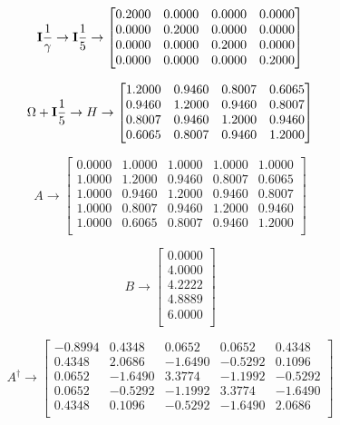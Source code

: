 \begin{equation}
  \vb{I}\frac{1}{\gamma}\to\vb{I}\frac{1}{5}\to
  \begin{bmatrix}
    0.2000 & 0.0000 & 0.0000 & 0.0000 \\
    0.0000 & 0.2000 & 0.0000 & 0.0000 \\
    0.0000 & 0.0000 & 0.2000 & 0.0000 \\
    0.0000 & 0.0000 & 0.0000 & 0.2000
  \end{bmatrix}
\end{equation}

\begin{equation}
  \Omega+\vb{I}\frac{1}{5}\to H\to
  \begin{bmatrix}
    1.2000 & 0.9460 & 0.8007 & 0.6065 \\
    0.9460 & 1.2000 & 0.9460 & 0.8007 \\
    0.8007 & 0.9460 & 1.2000 & 0.9460 \\
    0.6065 & 0.8007 & 0.9460 & 1.2000 \\
  \end{bmatrix}
\end{equation}

\begin{equation}
  A\to
  \begin{bmatrix}
    0.0000 & 1.0000 & 1.0000 & 1.0000 & 1.0000 \\
    1.0000 & 1.2000 & 0.9460 & 0.8007 & 0.6065 \\
    1.0000 & 0.9460 & 1.2000 & 0.9460 & 0.8007 \\
    1.0000 & 0.8007 & 0.9460 & 1.2000 & 0.9460 \\
    1.0000 & 0.6065 & 0.8007 & 0.9460 & 1.2000 \\
  \end{bmatrix}
\end{equation}

\begin{equation}
  B\to
  \begin{bmatrix}
    0.0000 \\
    4.0000 \\
    4.2222 \\
    4.8889 \\
    6.0000 \\
  \end{bmatrix}
\end{equation}

\begin{equation}
  A^{\dag}\to
  \begin{bmatrix}
    -0.8994 & 0.4348  & 0.0652  & 0.0652  & 0.4348  \\
    0.4348  & 2.0686  & -1.6490 & -0.5292 & 0.1096  \\
    0.0652  & -1.6490 & 3.3774  & -1.1992 & -0.5292 \\
    0.0652  & -0.5292 & -1.1992 & 3.3774  & -1.6490 \\
    0.4348  & 0.1096  & -0.5292 & -1.6490 & 2.0686  \\
  \end{bmatrix}
\end{equation}

